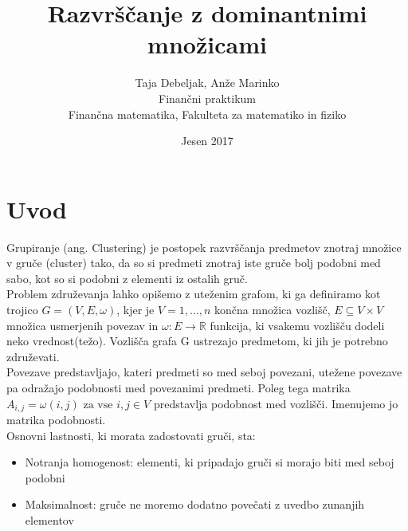 \documentclass[a4paper]{article}
\title{Razvrščanje z dominantnimi množicami}
\author{Taja Debeljak, Anže Marinko \\ Finančni praktikum \\ Finančna matematika, Fakulteta za matematiko in fiziko}
\date{Jesen 2017}
\begin{document}
\maketitle
\section{Uvod}
Grupiranje (ang. Clustering) je postopek razvrščanja predmetov znotraj množice v gruče (cluster) tako, da so si predmeti znotraj iste gruče bolj podobni med sabo, kot so si podobni z elementi iz ostalih gruč. \\
Problem združevanja lahko opišemo z uteženim grafom, ki ga definiramo kot trojico $G = (V,E,\omega)$, kjer je $V = {1,\ldots,n}$ končna množica vozlišč, $E \subseteq V \times V$ množica usmerjenih
povezav in $\omega: E \rightarrow \mathbb{R}$ funkcija, ki vsakemu vozlišču dodeli neko vrednost(težo). Vozlišča grafa G ustrezajo predmetom, ki jih je potrebno združevati. \\
Povezave predstavljajo, kateri predmeti so med seboj povezani, utežene povezave pa odražajo podobnosti med povezanimi predmeti. Poleg tega matrika $A_{i,j} = \omega(i,j) \text{ za vse } i, j \in V$ predstavlja podobnost med vozlišči. Imenujemo jo matrika podobnosti. \\
Osnovni lastnosti, ki morata zadostovati gruči, sta:
\begin{itemize}
\item Notranja homogenost: elementi, ki pripadajo gruči si morajo biti med seboj podobni
\item Maksimalnost: gruče ne moremo dodatno povečati z uvedbo zunanjih elementov
\end{itemize}
\end{document}

